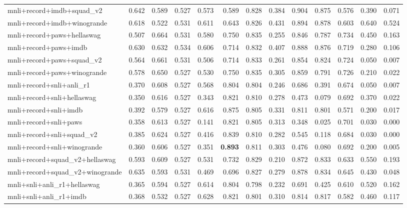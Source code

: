 \begin{table}[t]
\begin{tabular}{lrrrrrrrrrrrr}
    mnli+record+imdb+squad\_v2 & 0.642 & 0.589 & 0.527 & 0.573 & 0.589 & 0.828 & 0.384 & 0.904 & 0.875 & 0.576 & 0.390 & 0.071 \\
    mnli+record+imdb+winogrande & 0.618 & 0.522 & 0.531 & 0.611 & 0.643 & 0.826 & 0.431 & 0.894 & 0.878 & 0.603 & 0.640 & 0.524 \\
    mnli+record+paws+hellaswag & 0.507 & 0.664 & 0.531 & 0.580 & 0.750 & 0.835 & 0.255 & 0.846 & 0.787 & 0.734 & 0.450 & 0.163 \\
    mnli+record+paws+imdb & 0.630 & 0.632 & 0.534 & 0.606 & 0.714 & 0.832 & 0.407 & 0.888 & 0.876 & 0.719 & 0.280 & 0.106 \\
    mnli+record+paws+squad\_v2 & 0.564 & 0.661 & 0.531 & 0.506 & 0.714 & 0.833 & 0.261 & 0.854 & 0.824 & 0.724 & 0.050 & 0.007 \\
    mnli+record+paws+winogrande & 0.578 & 0.650 & 0.527 & 0.530 & 0.750 & 0.835 & 0.305 & 0.859 & 0.791 & 0.726 & 0.210 & 0.022 \\
    mnli+record+snli+anli\_r1 & 0.370 & 0.608 & 0.527 & 0.568 & 0.804 & 0.804 & 0.246 & 0.686 & 0.391 & 0.674 & 0.050 & 0.007 \\
    mnli+record+snli+hellaswag & 0.350 & 0.616 & 0.527 & 0.343 & 0.821 & 0.810 & 0.278 & 0.473 & 0.079 & 0.692 & 0.370 & 0.022 \\
    mnli+record+snli+imdb & 0.392 & 0.579 & 0.527 & 0.616 & 0.875 & 0.805 & 0.331 & 0.811 & 0.801 & 0.571 & 0.200 & 0.017 \\
    mnli+record+snli+paws & 0.358 & 0.613 & 0.527 & 0.141 & 0.821 & 0.805 & 0.313 & 0.348 & 0.025 & 0.701 & 0.030 & 0.000 \\
    mnli+record+snli+squad\_v2 & 0.385 & 0.624 & 0.527 & 0.416 & 0.839 & 0.810 & 0.282 & 0.545 & 0.118 & 0.684 & 0.030 & 0.000 \\
    mnli+record+snli+winogrande & 0.360 & 0.606 & 0.527 & 0.351 & \textbf{0.893} & 0.811 & 0.303 & 0.476 & 0.080 & 0.692 & 0.200 & 0.005 \\
    mnli+record+squad\_v2+hellaswag & 0.593 & 0.609 & 0.527 & 0.531 & 0.732 & 0.829 & 0.210 & 0.872 & 0.833 & 0.633 & 0.550 & 0.193 \\
    mnli+record+squad\_v2+winogrande & 0.635 & 0.593 & 0.531 & 0.469 & 0.696 & 0.827 & 0.279 & 0.878 & 0.834 & 0.645 & 0.430 & 0.048 \\
    mnli+snli+anli\_r1+hellaswag & 0.365 & 0.594 & 0.527 & 0.614 & 0.804 & 0.798 & 0.232 & 0.691 & 0.425 & 0.610 & 0.520 & 0.162 \\
    mnli+snli+anli\_r1+imdb & 0.368 & 0.532 & 0.527 & 0.628 & 0.821 & 0.801 & 0.310 & 0.814 & 0.817 & 0.582 & 0.460 & 0.117 \\

\end{tabular}
\end{table}
